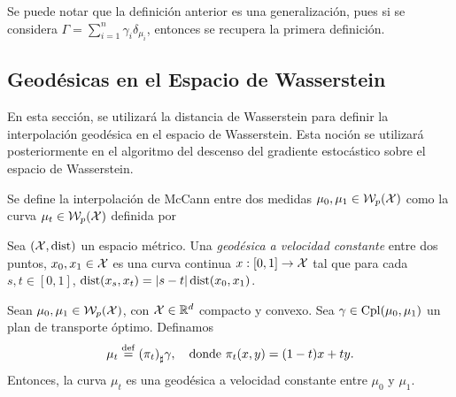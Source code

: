 {{{\begin{definition}
			\end{definition}

			\begin{remark}
				Se puede notar que la definición anterior es una generalización, pues si se considera $\Gamma = \sum_{i=1}^{n} \gamma_i \delta_{\mu_i}$, entonces se recupera la primera definición.
			\end{remark}



		}  %


		\subsection{Geodésicas en el Espacio de Wasserstein}\label{ssec:geodesicas-Wasserstein}
		{
			En esta sección, se utilizará la distancia de Wasserstein para definir la interpolación geodésica en el espacio de Wasserstein. Esta noción se utilizará posteriormente en el algoritmo del descenso del gradiente estocástico sobre el espacio de Wasserstein.

			\begin{definition}
				Se define la interpolación de McCann entre dos medidas $\mu_0, \mu_1 \in \WassersteinSpace[p]{\cX} $ como la curva $\mu_t \in \WassersteinSpace[p]{\cX} $ definida por

			\end{definition}


			\begin{definition}
				Sea $(\cX, \dist)$ un espacio métrico. Una \emph{geodésica a velocidad constante}  entre dos puntos, $x_0, x_1 \in \cX$ es una curva continua $x : [0, 1] \to \cX$  tal que para cada $s, t \in [0, 1]$, $\dist(x_s,x_t) = |s - t| \dist(x_0,x_1) $.
			\end{definition}

			\begin{proposition}
				Sean $\mu_0, \mu_1 \in \WassersteinSpace[p]{\cX} $, con $\cX \in \R^d$  compacto y convexo. Sea $\gamma \in \Cpl(\mu_0, \mu_1)$  un plan de transporte óptimo. Definamos
				\begin{equation}
					\mu_t \eqdef \pf{(\pi_t)} \gamma, \quad \text{donde } \pi_t(x, y) = (1-t)x + ty.
				\end{equation}
				Entonces, la curva $\mu_t$ es una geodésica a velocidad constante entre $\mu_0$ y $\mu_1$.


\end{proposition}}}}
